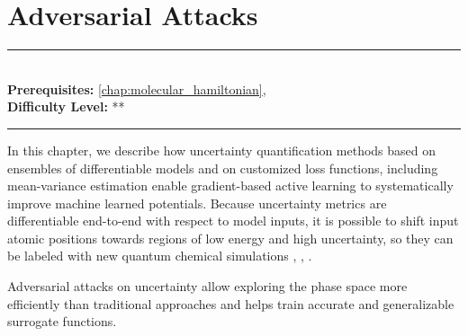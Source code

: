 \documentclass[book.tex]{subfiles}
\begin{document}
\chapter{Adversarial Attacks}
\label{chap:ani}
\noindent\rule{11cm}{0.4pt} \\
\textbf{Prerequisites:}  \autoref{chap:molecular_hamiltonian},   \\
\textbf{Difficulty Level:} ** \\
\noindent\rule{11cm}{0.4pt}
\vspace{5mm}


In this chapter, we describe how uncertainty quantification methods based on ensembles of differentiable models and on customized loss functions, including mean-variance estimation enable gradient-based active learning to systematically improve machine learned potentials. Because uncertainty metrics are differentiable end-to-end with respect to model inputs, it is possible to shift input atomic positions towards regions of low energy and high uncertainty, so they can be labeled with new quantum chemical simulations \cite{wang2020active}, \cite{ang2021active}, \cite{schwalbe2021differentiable}.

Adversarial attacks on uncertainty allow exploring the phase space  more efficiently than traditional approaches and helps train accurate and generalizable surrogate functions.




\end{document}
